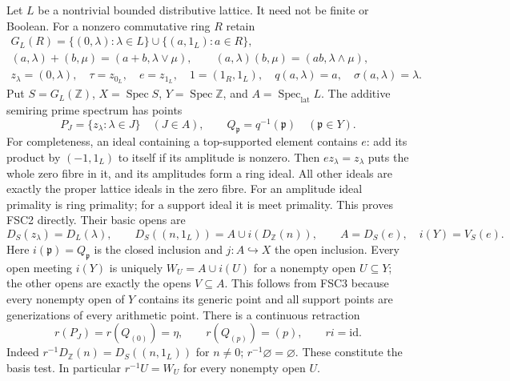 Let $L$ be a nontrivial bounded distributive lattice. It need not be
finite or Boolean. For a nonzero commutative ring $R$ retain
\begin{equation}\tag{FSC1}
 \begin{gathered}
 G_L(R)=\{(0,\lambda):\lambda\in L\}
                  \cup\{(a,1_L):a\in R\},\\
 (a,\lambda)+(b,\mu)=(a+b,\lambda\vee\mu),\qquad
 (a,\lambda)(b,\mu)=(ab,\lambda\wedge\mu),\\
 z_\lambda=(0,\lambda),\quad\tau=z_{0_L},\quad e=z_{1_L},
 \quad 1=(1_R,1_L),\quad q(a,\lambda)=a,\quad
 \sigma(a,\lambda)=\lambda.
 \end{gathered}
\end{equation}
Put $S=G_L(\mathbb Z)$, $X=\operatorname{Spec}S$,
$Y=\operatorname{Spec}\mathbb Z$, and
$A=\operatorname{Spec}_{\mathrm{lat}}L$. The additive semiring prime
spectrum has points
\begin{equation}\tag{FSC2}
 P_J=\{z_\lambda:\lambda\in J\}\quad(J\in A),\qquad
 Q_{\mathfrak p}=q^{-1}(\mathfrak p)\quad(\mathfrak p\in Y).
\end{equation}
For completeness, an ideal containing a top-supported element contains
$e$: add its product by $(-1,1_L)$ to itself if its amplitude is nonzero.
Then $ez_\lambda=z_\lambda$ puts the whole zero fibre in it, and its
amplitudes form a ring ideal. All other ideals are exactly the proper
lattice ideals in the zero fibre. For an amplitude ideal primality is
ring primality; for a support ideal it is meet primality. This proves
FSC2 directly. Their basic opens are
\begin{equation}\tag{FSC3}
 D_S(z_\lambda)=D_L(\lambda),\qquad
 D_S((n,1_L))=A\cup i(D_{\mathbb Z}(n)),\qquad
 A=D_S(e),\quad i(Y)=V_S(e).
\end{equation}
Here $i(\mathfrak p)=Q_{\mathfrak p}$ is the closed inclusion and
$j:A\hookrightarrow X$ the open inclusion. Every open meeting $i(Y)$
is uniquely $W_U=A\cup i(U)$ for a nonempty open $U\subseteq Y$;
the other opens are exactly the opens $V\subseteq A$. This follows
from FSC3 because every nonempty open of $Y$ contains its generic
point and all support points are generizations of every arithmetic
point. There is a continuous retraction
\begin{equation}\tag{FSC4}
 r(P_J)=r(Q_{(0)})=\eta,\qquad r(Q_{(p)})=(p),\qquad ri=\mathrm{id}.
\end{equation}
Indeed $r^{-1}D_{\mathbb Z}(n)=D_S((n,1_L))$ for $n\ne0$;
$r^{-1}\varnothing=\varnothing$. These constitute the basis test.
In particular $r^{-1}U=W_U$ for every nonempty open $U$.


